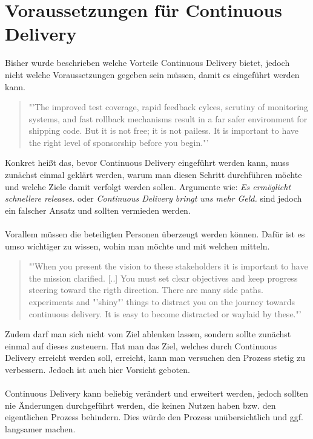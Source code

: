\section{Voraussetzungen für Continuous Delivery}
\label{sec:VoraussetzungenCD}
Bisher wurde beschrieben welche Vorteile Continuous Delivery bietet, jedoch nicht welche Voraussetzungen gegeben sein müssen, damit es eingeführt werden kann.

\begin{quote}
	"'The improved test coverage, rapid feedback cylces, scrutiny of monitoring systems, and fast rollback mechanisms result in a far safer environment for shipping code. But it is not free; it is not pailess. It is important to have the right level of sponsorship before you begin."'\cite{RallySofware2013}
\end{quote}
Konkret heißt das, bevor Continuous Delivery eingeführt werden kann, muss zunächst einmal geklärt werden, warum man diesen Schritt durchführen möchte und welche Ziele damit verfolgt werden sollen. Argumente wie: \textit{Es ermöglicht schnellere releases.} oder \textit{Continuous Delivery bringt uns mehr Geld.} sind jedoch ein falscher Ansatz und sollten vermieden werden.
\\\\
Vorallem müssen die beteiligten Personen überzeugt werden können. Dafür ist es umso wichtiger zu wissen, wohin man möchte und mit welchen mitteln.

\begin{quote}
	"'When you present the vision to these stakeholders it is important to have the mission clarified. [..] You must set clear objectives and keep progress steering toward the rigth direction. There are many side paths. experiments and "'shiny"' things to distract you on the journey towards continuous delivery. It is easy to become distracted or waylaid by these."'\cite{RallySofware2013}
\end{quote} 
Zudem darf man sich nicht vom Ziel ablenken lassen, sondern sollte zunächst einmal auf dieses zusteuern. Hat man das Ziel, welches durch Continuous Delivery erreicht werden soll, erreicht, kann man versuchen den Prozess stetig zu verbessern. Jedoch ist auch hier Vorsicht geboten.
\\\\
Continuous Delivery kann beliebig verändert und erweitert werden, jedoch sollten nie Änderungen durchgeführt werden, die keinen Nutzen haben bzw. den eigentlichen Prozess behindern. Dies würde den Prozess unübersichtlich und ggf. langsamer machen.

